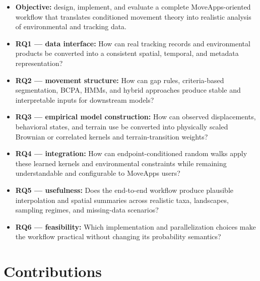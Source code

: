 \begin{itemize}
  \item \textbf{Objective:} design, implement, and evaluate a complete MoveApps-oriented workflow that translates conditioned movement theory into realistic analysis of environmental and tracking data.
  \item \textbf{RQ1 --- data interface:} How can real tracking records and environmental products be converted into a consistent spatial, temporal, and metadata representation?
  \item \textbf{RQ2 --- movement structure:} How can gap rules, criteria-based segmentation, BCPA, HMMs, and hybrid approaches produce stable and interpretable inputs for downstream models?
  \item \textbf{RQ3 --- empirical model construction:} How can observed displacements, behavioral states, and terrain use be converted into physically scaled Brownian or correlated kernels and terrain-transition weights?
  \item \textbf{RQ4 --- integration:} How can endpoint-conditioned random walks apply these learned kernels and environmental constraints while remaining understandable and configurable to MoveApps users?
  \item \textbf{RQ5 --- usefulness:} Does the end-to-end workflow produce plausible interpolation and spatial summaries across realistic taxa, landscapes, sampling regimes, and missing-data scenarios?
  \item \textbf{RQ6 --- feasibility:} Which implementation and parallelization choices make the workflow practical without changing its probability semantics?
\end{itemize}

\section{Contributions}

